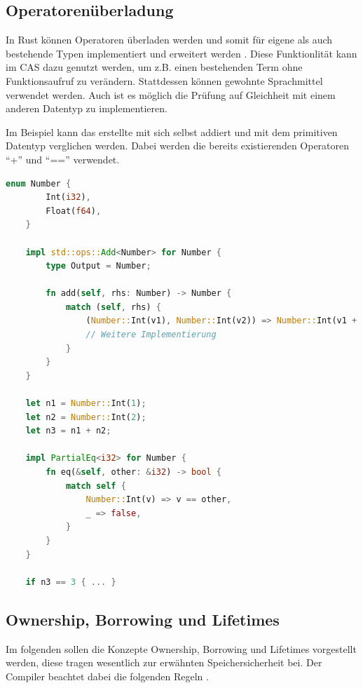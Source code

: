 \documentclass[11pt,a4paper, ngerman]{article}
\begin{document}
\subsection{Operatorenüberladung} In Rust können Operatoren überladen werden und somit für eigene als auch bestehende Typen implementiert und erweitert werden \cite{OperatorOverloading} \cite[S. 246 ff.]{BO18}. Diese Funktionlität kann im CAS dazu genutzt werden, um z.B. einen bestehenden Term ohne Funktionsaufruf zu verändern. Stattdessen können gewohnte Sprachmittel verwendet werden. Auch ist es möglich die Prüfung auf Gleichheit mit einem anderen Datentyp zu implementieren.

Im Beispiel kann das erstellte  mit sich selbst addiert und mit dem primitiven Datentyp  verglichen werden. Dabei werden die bereits existierenden Operatoren ``+'' und ``=='' verwendet.

\begin{lstlisting}[language=rust, caption={Operatorenüberladung}]
    enum Number {
        Int(i32),
        Float(f64),
    }

    impl std::ops::Add<Number> for Number {
        type Output = Number;

        fn add(self, rhs: Number) -> Number {
            match (self, rhs) {
                (Number::Int(v1), Number::Int(v2)) => Number::Int(v1 + v2),
                // Weitere Implementierung
            }
        }
    }

    let n1 = Number::Int(1);
    let n2 = Number::Int(2);
    let n3 = n1 + n2;

    impl PartialEq<i32> for Number {
        fn eq(&self, other: &i32) -> bool {
            match self {
                Number::Int(v) => v == other,
                _ => false,
            }
        }
    }

    if n3 == 3 { ... }
\end{lstlisting}

\subsection{Ownership, Borrowing und Lifetimes}
Im folgenden sollen die Konzepte Ownership, Borrowing und Lifetimes vorgestellt werden, diese tragen wesentlich zur erwähnten Speichersicherheit bei. Der Compiler beachtet dabei die folgenden Regeln \cite{Rules1} \cite{Rules2}.
\end{document}
